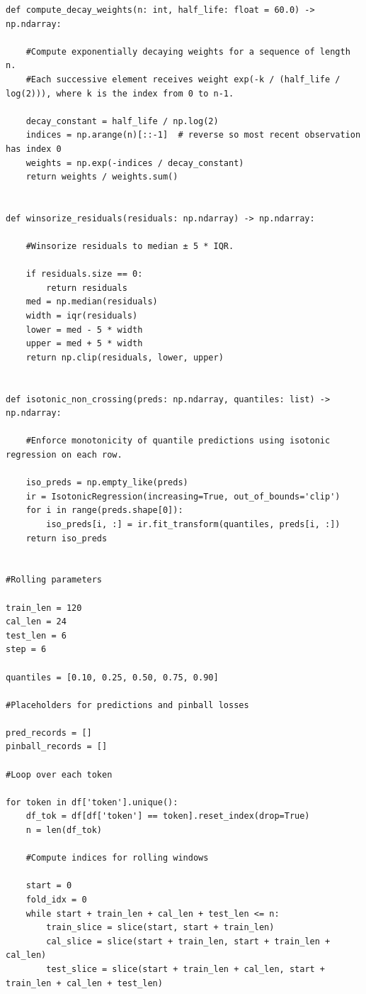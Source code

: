 \documentclass[
  a4paper,
  DIV=11,
  numbers=noendperiod]{scrreprt}
\begin{document}
\begin{verbatim}
def compute_decay_weights(n: int, half_life: float = 60.0) -> np.ndarray:

    #Compute exponentially decaying weights for a sequence of length n.
    #Each successive element receives weight exp(-k / (half_life / log(2))), where k is the index from 0 to n-1.

    decay_constant = half_life / np.log(2)
    indices = np.arange(n)[::-1]  # reverse so most recent observation has index 0
    weights = np.exp(-indices / decay_constant)
    return weights / weights.sum()


def winsorize_residuals(residuals: np.ndarray) -> np.ndarray:

    #Winsorize residuals to median ± 5 * IQR.

    if residuals.size == 0:
        return residuals
    med = np.median(residuals)
    width = iqr(residuals)
    lower = med - 5 * width
    upper = med + 5 * width
    return np.clip(residuals, lower, upper)


def isotonic_non_crossing(preds: np.ndarray, quantiles: list) -> np.ndarray:

    #Enforce monotonicity of quantile predictions using isotonic regression on each row.

    iso_preds = np.empty_like(preds)
    ir = IsotonicRegression(increasing=True, out_of_bounds='clip')
    for i in range(preds.shape[0]):
        iso_preds[i, :] = ir.fit_transform(quantiles, preds[i, :])
    return iso_preds


#Rolling parameters

train_len = 120
cal_len = 24
test_len = 6
step = 6

quantiles = [0.10, 0.25, 0.50, 0.75, 0.90]

#Placeholders for predictions and pinball losses

pred_records = []
pinball_records = []

#Loop over each token

for token in df['token'].unique():
    df_tok = df[df['token'] == token].reset_index(drop=True)
    n = len(df_tok)

    #Compute indices for rolling windows

    start = 0
    fold_idx = 0
    while start + train_len + cal_len + test_len <= n:
        train_slice = slice(start, start + train_len)
        cal_slice = slice(start + train_len, start + train_len + cal_len)
        test_slice = slice(start + train_len + cal_len, start + train_len + cal_len + test_len)


\end{verbatim}
\end{document}
